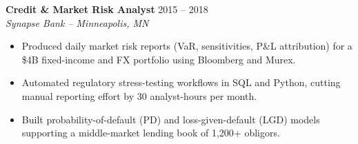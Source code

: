 \documentclass[10pt]{article}
\newcommand{\role}[3]{%
  \textbf{\color{navy}#1} \hfill {\small\color{slate}#3}\\
  {\small\itshape\color{gold!55!navy}#2}\\[2pt]%
}
\begin{document}
\begin{minipage}[t]{0.625\linewidth}
\role{Credit \& Market Risk Analyst}{Synapse Bank -- Minneapolis, MN}{2015 -- 2018}
{\small
\begin{itemize}
\item Produced daily market risk reports (VaR, sensitivities, P\&L attribution) for a \$4B fixed-income and FX portfolio using Bloomberg and Murex.
\item Automated regulatory stress-testing workflows in SQL and Python, cutting manual reporting effort by 30 analyst-hours per month.
\item Built probability-of-default (PD) and loss-given-default (LGD) models supporting a middle-market lending book of 1,200+ obligors.
\end{itemize}
}

\end{minipage}
\end{document}

